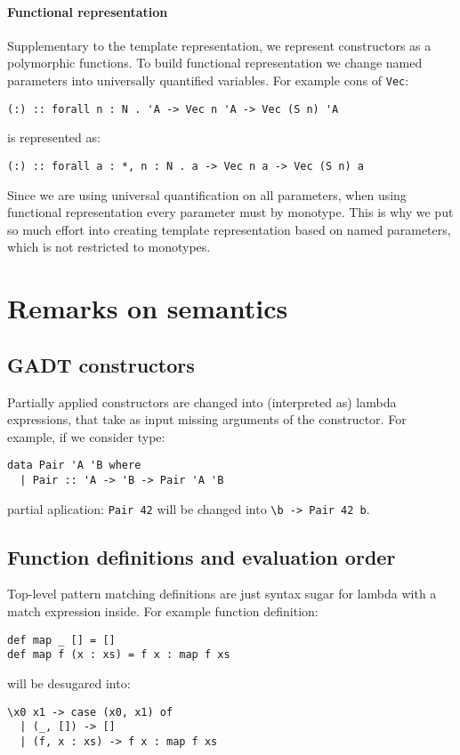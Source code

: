 \documentclass[declaration,shortabstract,english]{iithesis}
\begin{document}
\subsubsection*{Functional representation}
Supplementary to the template representation, we represent constructors as a polymorphic functions.
To build functional representation we change named parameters into universally quantified variables.
For example cons of \verb+Vec+:
\begin{verbatim}
(:) :: forall n : N . 'A -> Vec n 'A -> Vec (S n) 'A
\end{verbatim}
is represented as:
\begin{verbatim}
(:) :: forall a : *, n : N . a -> Vec n a -> Vec (S n) a
\end{verbatim}
Since we are using universal quantification on all parameters,
when using functional representation every parameter must by monotype.
This is why we put so much effort into creating template representation based on named
parameters, which is not restricted to monotypes.

\chapter{Remarks on semantics}
\section{GADT constructors}
Partially applied constructors are changed into (interpreted as) lambda expressions, that take as input missing arguments of the constructor.
For example, if we consider type:
\begin{verbatim}
data Pair 'A 'B where
  | Pair :: 'A -> 'B -> Pair 'A 'B
\end{verbatim}
partial aplication: \verb+Pair 42+ will be changed into \verb+\b -> Pair 42 b+.
\section{Function definitions and evaluation order}
Top-level pattern matching definitions are just syntax sugar for lambda with a match expression inside.
For example function definition:
\begin{verbatim}
def map _ [] = []
def map f (x : xs) = f x : map f xs
\end{verbatim}
will be desugared into:
\begin{verbatim}
\x0 x1 -> case (x0, x1) of
  | (_, []) -> []
  | (f, x : xs) -> f x : map f xs
\end{verbatim}
\end{document}
